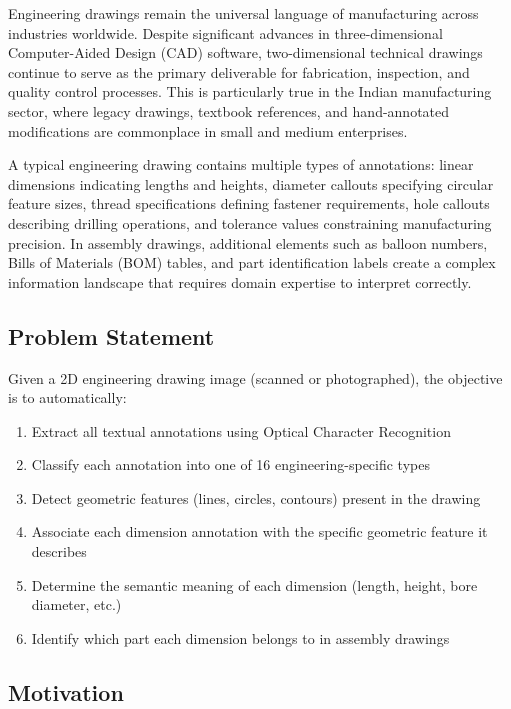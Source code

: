\documentclass[12pt,a4paper]{article}
\begin{document}
Engineering drawings remain the universal language of manufacturing across industries worldwide. Despite significant advances in three-dimensional Computer-Aided Design (CAD) software, two-dimensional technical drawings continue to serve as the primary deliverable for fabrication, inspection, and quality control processes. This is particularly true in the Indian manufacturing sector, where legacy drawings, textbook references, and hand-annotated modifications are commonplace in small and medium enterprises.

A typical engineering drawing contains multiple types of annotations: linear dimensions indicating lengths and heights, diameter callouts specifying circular feature sizes, thread specifications defining fastener requirements, hole callouts describing drilling operations, and tolerance values constraining manufacturing precision. In assembly drawings, additional elements such as balloon numbers, Bills of Materials (BOM) tables, and part identification labels create a complex information landscape that requires domain expertise to interpret correctly.

\subsection{Problem Statement}

Given a 2D engineering drawing image (scanned or photographed), the objective is to automatically:
\begin{enumerate}[noitemsep]
    \item Extract all textual annotations using Optical Character Recognition
    \item Classify each annotation into one of 16 engineering-specific types
    \item Detect geometric features (lines, circles, contours) present in the drawing
    \item Associate each dimension annotation with the specific geometric feature it describes
    \item Determine the semantic meaning of each dimension (length, height, bore diameter, etc.)
    \item Identify which part each dimension belongs to in assembly drawings
\end{enumerate}

\subsection{Motivation}
\end{document}
